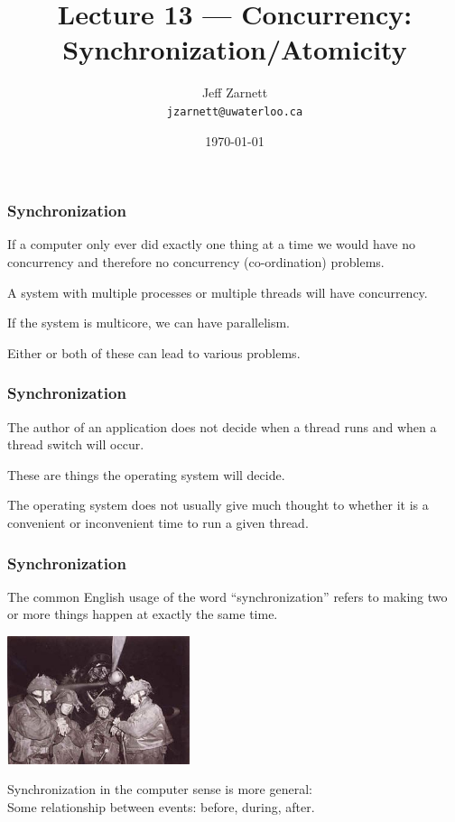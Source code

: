 

\title{Lecture 13 --- Concurrency: Synchronization/Atomicity }

\author{Jeff Zarnett \\ \small \texttt{jzarnett@uwaterloo.ca}}
\date{\today}




\begin{frame}
	\titlepage

\end{frame}


\begin{frame}
	\frametitle{Synchronization}

	If a computer only ever did exactly one thing at a time we would have no concurrency and therefore no concurrency (co-ordination) problems.

	A system with multiple processes or multiple threads will have concurrency.

	If the system is multicore, we can have parallelism.

	Either or both of these can lead to various problems.


\end{frame}

\begin{frame}
	\frametitle{Synchronization}

	The author of an application does not decide when a thread runs and when a thread switch will occur.

	These are things the operating system will decide.

	The operating system does not usually give much thought to whether it is a convenient or inconvenient time to run a given thread.


\end{frame}

\begin{frame}
	\frametitle{Synchronization}

	The common English usage of the word ``synchronization'' refers to making two or more things happen at exactly the same time.

	\begin{center}
		\includegraphics[width=0.4\textwidth]{images/synchronize-watches.jpg}
	\end{center}

	Synchronization in the computer sense is more general:\\
	\quad Some relationship between events: before, during, after.

\end{frame}



